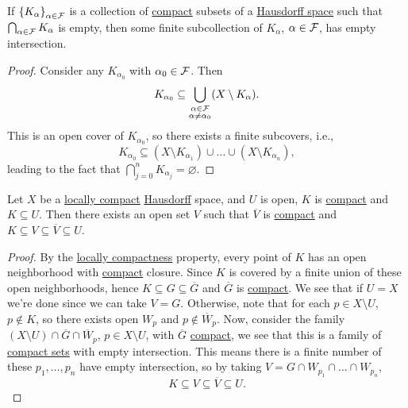 \begin{theorem}
	If \(\left\{ K_\alpha  \right\}_{\alpha \in \mathcal{\MakeUppercase{f}} } \) is a collection of \hyperref[def:compact]{compact} subsets of a \hyperref[def:Hausdorff]{Hausdorff space} such that \(\bigcap_{\alpha \in \mathcal{\MakeUppercase{f}} } K_\alpha \) is empty, then some finite subcollection of \(K_\alpha \), \(\alpha \in \mathcal{\MakeUppercase{f}} \), has empty intersection.
\end{theorem}
\begin{proof}
	Consider any \(K_{\alpha_0} \) with \(\alpha _0\in \mathcal{\MakeUppercase{f}} \). Then
	\[
		K_{\alpha _0} \subseteq \bigcup_{\substack{\alpha \in \mathcal{\MakeUppercase{f}} \\ \alpha \neq \alpha _0}} (X\setminus K_\alpha ).
	\]
	This is an open cover of \(K_{\alpha _0}\), so there exists a finite subcovers, i.e.,
	\[
		K_{\alpha _0} \subseteq (X \setminus K_{\alpha _1}) \cup \ldots \cup (X \setminus K_{\alpha _n}),
	\]
	leading to the fact that \(\bigcap_{j=0}^{n} K_{\alpha _j} = \varnothing \).
\end{proof}

\begin{theorem}
	Let \(X\) be a \hyperref[def:locally-compact]{locally compact} \hyperref[def:Hausdorff]{Hausdorff} space, and \(U\) is open, \(K\) is \hyperref[def:compact]{compact} and \(K \subseteq U\). Then there exists an open set \(V\) such that \(\overline{V} \) is \hyperref[def:compact]{compact} and \(K \subseteq V \subseteq \overline{V} \subseteq U\).
\end{theorem}
\begin{proof}
	By the \hyperref[def:locally-compact]{locally compactness} property, every point of \(K\) has an open neighborhood with \hyperref[def:compact]{compact} closure. Since \(K\) is covered by a finite union of these open neighborhoods, hence \(K \subseteq G \subseteq \overline{G} \) and \(\overline{G} \) is \hyperref[def:compact]{compact}. We see that if \(U = X\) we're done since we can take \(V = G\). Otherwise, note that for each \(p\in X \setminus U\), \(p\notin K\), so there exists open \(W_p\) and \(p \notin \overline{W} _p\). Now, consider the family \((X \setminus U) \cap \overline{G} \cap \overline{W} _p\), \(p\in X\setminus U\), with \(\overline{G} \) \hyperref[def:compact]{compact}, we see that this is a family of \hyperref[def:compact]{compact sets} with empty intersection. This means there is a finite number of these \(p_1, \ldots  , p_n\) have empty intersection, so by taking \(V = G \cap W_{p_1} \cap \ldots  \cap W_{p_n}\),
	\[
		K \subseteq V \subseteq \overline{V} \subseteq U.
	\]
\end{proof}

